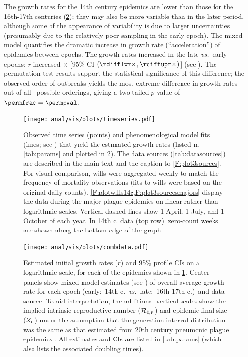 The growth rates for the 14th century epidemics are lower than those for the 16th-17th centuries (\cref{F:combdata}); they may also be more variable than in the later period, although some of the appearance of variability is due to larger uncertainties (presumably due to the relatively poor sampling in the early epoch). The mixed model quantifies the dramatic increase in growth rate (``acceleration'') of epidemics between epochs.
The growth rates increased \foldval in the late \emph{vs.}\ early epochs: $r$ increased \rdiffest $\times$ [95\% CI $(\rdifflwr\times, \rdiffupr\times)$] (see \Methodslink). The permutation test results support the statistical significance of this difference; the observed order of outbreaks yields the most extreme difference in growth rates out of all \nperm\ possible orderings, giving a two-tailed $p$-value of $\permfrac=\permpval$.


%
\begin{figure}
\begin{center}
\texttt{[image: analysis/plots/timeseries.pdf]}
\end{center}
\caption[]{Observed time series (points) and \hyperlink{phenmod}{phenomenological model} fits (lines; see \Methodslink) that yield the estimated growth rates (listed in \cref{tab:params} and plotted in \cref{F:combdata}).  The data sources (\cref{tab:datasources}) are described in the main text and the caption to \cref{F:plot3sources}.  For visual comparison, wills were aggregated weekly to match the frequency of mortality observations (fits to wills were based on the original daily counts).
  \cref{F:plotwills14c,F:plot3sourcesmajors} display the data during the major plague epidemics on linear rather than logarithmic scales.
  Vertical dashed lines show 1 April, 1 July, and 1 October of each year.
  In 14th c. data (top row), zero-count weeks are shown along the bottom edge of the graph.
}
\label{F:timeseries}
\end{figure}
%

%
\begin{figure}
\begin{center} 
\texttt{[image: analysis/plots/combdata.pdf]} 
\end{center} \caption[Estimated initial growth rates]{Estimated initial growth rates ($r$) and 95\% profile CIs on a logarithmic scale, for each of the epidemics shown in \cref{F:timeseries}.  Center panels show mixed-model estimates (see \Methodslink) of overall average growth rate for each epoch (early:\ 14th c.\ \emph{vs.}\ late:\ 16th-17th c.{})\ and data source.  To aid interpretation, the additional vertical scales show the implied intrinsic reproductive number (${\mathcal R}_{0,\mbox{\tiny P}}$) and epidemic final size ($Z_{\mbox{\tiny P}}$) under the assumption that the generation interval distribution \cite{WallLips07} was the same as that estimated from 20th century pneumonic plague epidemics \cite{GaniLeac04}. All estimates and CIs are listed in \cref{tab:params} (which also lists the associated doubling times).}
\label{F:combdata}
\end{figure}
%

